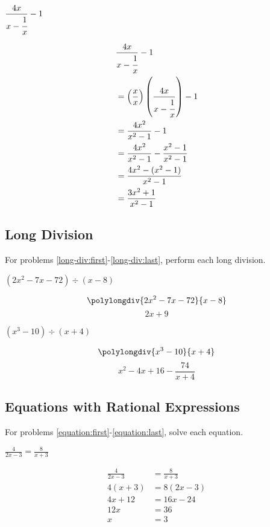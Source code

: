 \documentclass[fleqn,addpoints]{exam}
\begin{document}
\begin{questions}
\begin{solution}[5 cm]
\end{solution}

\question[7] \( \displaystyle \frac{4x}{x - \cfrac{1}{x}} - 1 \)
\label{complex:last}
\begin{solution}[5 cm]
\begin{align*}
  & \frac{4x}{x - \cfrac{1}{x}} - 1 \\
  &= \left( \frac{x}{x} \right) \left( \frac{4x}{x - \cfrac{1}{x}} \right) - 1 \\  
  &=  \frac{4x^2}{x^2 - 1} - 1 \\
  &=  \frac{4x^2}{x^2 - 1} - \frac{x^2-1}{x^2-1} \\
  &=  \frac{4x^2 - (x^2 - 1)}{x^2 - 1} \\
  &=  \frac{3x^2 + 1}{x^2 - 1} \\
\end{align*}

\end{solution}

\subsection{Long Division}

For problems \ref{long-div:first}-\ref{long-div:last}, perform each long division.

\question[7] \( (2x^2-7x-72) \div (x-8) \)
\label{long-div:first}
\begin{solution}[7 cm]
\[ \polylongdiv{2x^2-7x-72}{x-8} \]
\[ 2x+9 \]
\end{solution}

\question[10] \( (x^3-10) \div (x+4) \)
\label{long-div:last}
\begin{solution}[5 cm]
\[ \polylongdiv{x^3-10}{x+4} \]
\[ x^2-4x+16 - \frac{74}{x+4}\]
\end{solution}

\subsection{Equations with Rational Expressions}

For problems \ref{equation:first}-\ref{equation:last}, solve each equation.

\question[7] \( \displaystyle \frac{4}{2x-3} = \frac{8}{x+3} \)
\label{equation:first}
\begin{solution}[6 cm]
\begin{align*}
  \frac{4}{2x-3} &= \frac{8}{x+3} \\
  4(x+3) &= 8(2x-3) \\
  4x + 12 &= 16x - 24 \\
  12x &= 36 \\
  x &= 3 \\
\end{align*}
\end{solution}


\end{questions}
\end{document}
